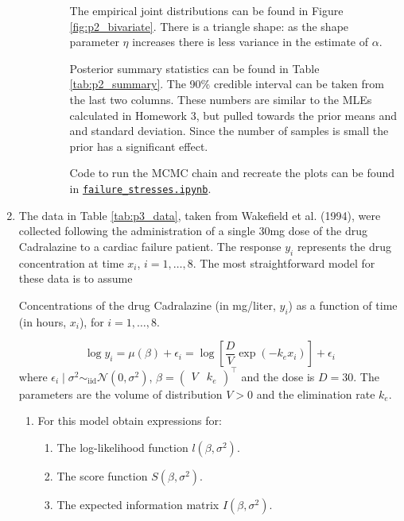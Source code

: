 \documentclass[letterpaper,11pt]{article}
\begin{document}
\begin{enumerate}
\begin{enumerate}
\begin{description}
      The empirical joint distributions can be found in Figure
      \ref{fig:p2_bivariate}. There is a triangle shape: as the shape parameter
      $\eta$ increases there is less variance in the estimate of $\alpha$.

      Posterior summary statistics can be found in Table
      \ref{tab:p2_summary}. The 90\% credible interval can be taken from the
      last two columns. These numbers are similar to the MLEs calculated in
      Homework 3, but pulled towards the prior means and and standard
      deviation. Since the number of samples is small the prior has a
      significant effect.

      Code to run the MCMC chain and recreate the plots can be found in
      \href{http://nbviewer.jupyter.org/github/ppham27/stat570/blob/master/hw6/failure\_stresses.ipynb}{\texttt{failure\_stresses.ipynb}}.
    \end{description}
  \end{enumerate}
  
  \pagebreak
\item The data in Table \ref{tab:p3_data}, taken from Wakefield et al. (1994),
  were collected following the administration of a single 30mg dose of the drug
  Cadralazine to a cardiac failure patient. The response $y_i$ represents the
  drug concentration at time $x_i$, $i = 1,\ldots,8$. The most straightforward
  model for these data is to assume
  \begin{table}
    \centering
    
    \caption{Concentrations of the drug Cadralazine (in mg/liter, $y_i$) as a
      function of time (in hours, $x_i$), for $i = 1,\ldots,8$.}
    \label{tab:p3_data}
  \end{table}

  \begin{equation}
    \log y_i = \mu\left(\beta\right) + \epsilon_i =
    \log\left[
      \frac{D}{V}\exp\left(-k_e x_i\right)
    \right]
    + \epsilon_i
    \label{eqn:p3_model}
  \end{equation}
  where
  $\epsilon_i \mid \sigma^2 \sim_\mathrm{iid}
  \mathcal{N}\left(0,\sigma^2\right)$,
  $\beta = \begin{pmatrix}V & k_e \end{pmatrix}^\intercal$ and the dose is
  $D = 30$. The parameters are the volume of distribution $V > 0$ and the
  elimination rate $k_e$.
  \begin{enumerate}
  \item For this model obtain expressions for:
    \begin{enumerate}
    \item The log-likelihood function $l\left(\beta, \sigma^2\right)$.
    \item The score function $S\left(\beta, \sigma^2\right)$.
    \item The expected information matrix $I\left(\beta, \sigma^2\right)$.
    \end{enumerate}


\end{enumerate}
\end{enumerate}
\end{document}
